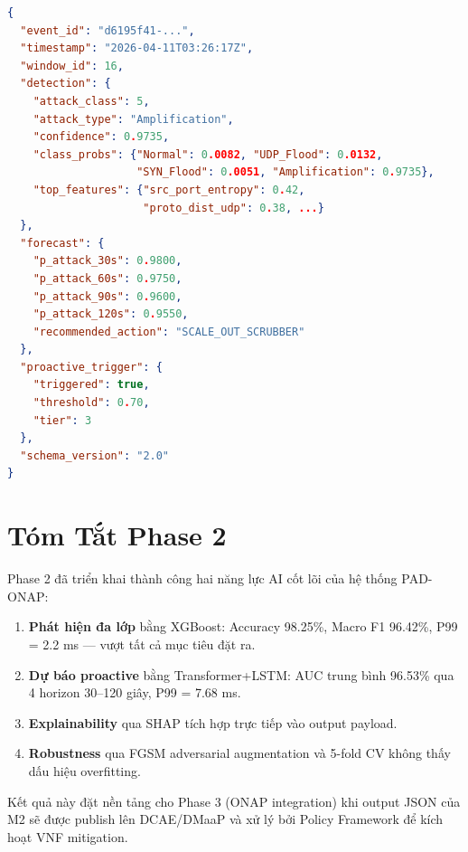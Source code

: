 \documentclass[12pt,a4paper]{article}
\begin{document}
\begin{lstlisting}[language=json,caption={Ví dụ AIOutputPayload JSON}]
{
  "event_id": "d6195f41-...",
  "timestamp": "2026-04-11T03:26:17Z",
  "window_id": 16,
  "detection": {
    "attack_class": 5,
    "attack_type": "Amplification",
    "confidence": 0.9735,
    "class_probs": {"Normal": 0.0082, "UDP_Flood": 0.0132,
                    "SYN_Flood": 0.0051, "Amplification": 0.9735},
    "top_features": {"src_port_entropy": 0.42,
                     "proto_dist_udp": 0.38, ...}
  },
  "forecast": {
    "p_attack_30s": 0.9800,
    "p_attack_60s": 0.9750,
    "p_attack_90s": 0.9600,
    "p_attack_120s": 0.9550,
    "recommended_action": "SCALE_OUT_SCRUBBER"
  },
  "proactive_trigger": {
    "triggered": true,
    "threshold": 0.70,
    "tier": 3
  },
  "schema_version": "2.0"
}
\end{lstlisting}

\section{Tóm Tắt Phase 2}

Phase 2 đã triển khai thành công hai năng lực AI cốt lõi của hệ thống PAD-ONAP:

\begin{enumerate}[leftmargin=2em]
\item \textbf{Phát hiện đa lớp} bằng XGBoost: Accuracy 98.25\%, Macro F1 96.42\%, P99 = 2.2 ms --- vượt tất cả mục tiêu đặt ra.
\item \textbf{Dự báo proactive} bằng Transformer+LSTM: AUC trung bình 96.53\% qua 4 horizon 30--120 giây, P99 = 7.68 ms.
\item \textbf{Explainability} qua SHAP tích hợp trực tiếp vào output payload.
\item \textbf{Robustness} qua FGSM adversarial augmentation và 5-fold CV không thấy dấu hiệu overfitting.
\end{enumerate}

Kết quả này đặt nền tảng cho Phase 3 (ONAP integration) khi output JSON của M2 sẽ được publish lên DCAE/DMaaP và xử lý bởi Policy Framework để kích hoạt VNF mitigation.
\end{document}
